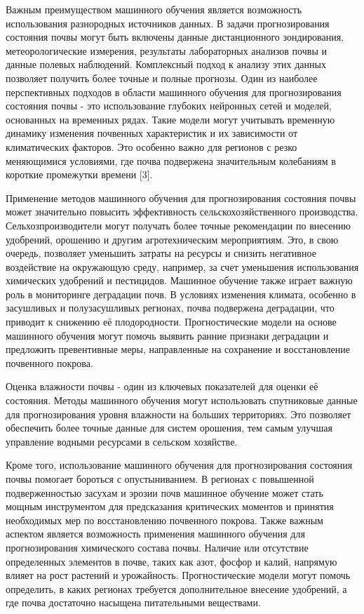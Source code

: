 \begin{multicols}{2}
Важным преимуществом машинного обучения является возможность
использования разнородных источников данных. В задачи прогнозирования
состояния почвы могут быть включены данные дистанционного зондирования,
метеорологические измерения, результаты лабораторных анализов почвы и
данные полевых наблюдений. Комплексный подход к анализу этих данных
позволяет получить более точные и полные прогнозы. Один из наиболее
перспективных подходов в области машинного обучения для прогнозирования
состояния почвы - это использование глубоких нейронных сетей и моделей,
основанных на временных рядах. Такие модели могут учитывать временную
динамику изменения почвенных характеристик и их зависимости от
климатических факторов. Это особенно важно для регионов с резко
меняющимися условиями, где почва подвержена значительным колебаниям в
короткие промежутки времени {[}3{]}.

Применение методов машинного обучения для прогнозирования состояния
почвы может значительно повысить эффективность сельскохозяйственного
производства. Сельхозпроизводители могут получать более точные
рекомендации по внесению удобрений, орошению и другим агротехническим
мероприятиям. Это, в свою очередь, позволяет уменьшить затраты на
ресурсы и снизить негативное воздействие на окружающую среду, например,
за счет уменьшения использования химических удобрений и пестицидов.
Машинное обучение также играет важную роль в мониторинге деградации
почв. В условиях изменения климата, особенно в засушливых и
полузасушливых регионах, почва подвержена деградации, что приводит к
снижению её плодородности. Прогностические модели на основе машинного
обучения могут помочь выявить ранние признаки деградации и предложить
превентивные меры, направленные на сохранение и восстановление
почвенного покрова.

Оценка влажности почвы - один из ключевых показателей для оценки её
состояния. Методы машинного обучения могут использовать спутниковые
данные для прогнозирования уровня влажности на больших территориях. Это
позволяет обеспечить более точные данные для систем орошения, тем самым
улучшая управление водными ресурсами в сельском хозяйстве.

Кроме того, использование машинного обучения для прогнозирования
состояния почвы помогает бороться с опустыниванием. В регионах с
повышенной подверженностью засухам и эрозии почв машинное обучение может
стать мощным инструментом для предсказания критических моментов и
принятия необходимых мер по восстановлению почвенного покрова. Также
важным аспектом является возможность применения машинного обучения для
прогнозирования химического состава почвы. Наличие или отсутствие
определенных элементов в почве, таких как азот, фосфор и калий, напрямую
влияет на рост растений и урожайность. Прогностические модели могут
помочь определить, в каких регионах требуется дополнительное внесение
удобрений, а где почва достаточно насыщена питательными веществами.


\end{multicols}
